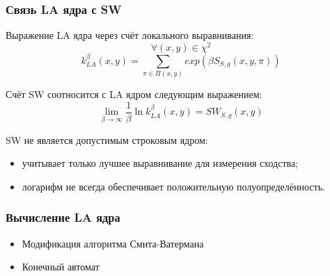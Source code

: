 \documentclass{beamer}
\begin{document}
\begin{frame}
\frametitle{Связь LA ядра с SW}
Выражение LA ядра через счёт локального выравнивания:
\begin{equation*}
    \forall (x, y) \in \chi^2
\end{equation*}
\begin{equation*}
    k_{LA}^{\beta}(x, y) = \sum_{\pi \in \Pi(x, y)}exp(\beta S_{S, g}(x, y, \pi))
\end{equation*}
\bigskip

Счёт SW соотносится с LA ядром следующим выражением:
\begin{equation*}
    \lim_{\beta\to\infty} \frac{1}{\beta} \ln k_{LA}^{\beta}(x, y)
    = SW_{S,g}(x, y)
\end{equation*}

SW не является допустимым строковым ядром:
\begin{itemize}
    \item учитывает только лучшее выравнивание для измерения сходства;
    \item логарифм не всегда обеспечивает положительную полуопределённость.
\end{itemize}
\end{frame}

\begin{frame}
\frametitle{Вычисление LA ядра}
\begin{itemize}
    \item Модификация алгоритма Смита-Ватермана
    \item Конечный автомат
        \begin{figure}[h]
        \end{figure}
\end{itemize}
\end{frame}

%




\end{document}
